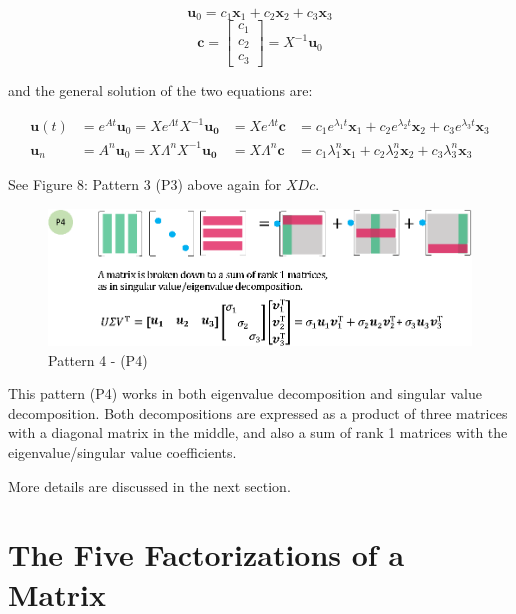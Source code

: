 \documentclass[letterpaper]{article}
\begin{document}
\begin{equation*}
  \bm{u}_0 = c_1 \bm{x}_1 + c_2 \bm{x}_2 + c_3 \bm{x}_3
\end{equation*}
\begin{equation*}
  \bm{c} =
  \begin{bmatrix}
    c_1\\
    c_2\\
    c_3
  \end{bmatrix} = X^{-1} \bm{u}_0
\end{equation*}

and the general solution of the two equations are:

\begin{align*}
  \bm{u}(t) &= e^{At} \bm{u}_0 = X e^{\Lambda t} X^{-1} \bm{u_0} &= X e^{\Lambda t} \bm{c} &= c_1 e^{\lambda_1 t} \bm{x}_1 + c_2 e^{\lambda_2 t} \bm{x}_2 + c_3 e^{\lambda_3 t} \bm{x}_3\\
  \bm{u}_n &= A^n \bm{u}_0 = X \Lambda^n X^{-1} \bm{u_0} &= X \Lambda^n \bm{c} &= c_1 \lambda_1^n \bm{x}_1 + c_2 \lambda_2^n \bm{x}_2 + c_3 \lambda_3^n \bm{x}_3
\end{align*}

See Figure 8: Pattern 3 (P3) above again for $XDc$.

\begin{figure}[H]
  \centering
  \includegraphics[scale=0.8]{Pattern4.eps}
  \caption{Pattern 4 - (P4)}
\end{figure}

This pattern (P4) works in both eigenvalue decomposition and singular value decomposition.
Both decompositions are expressed as a product of three matrices with a diagonal matrix in the middle,
and also a sum of rank 1 matrices with the eigenvalue/singular value coefficients.

More details are discussed in the next section.

\clearpage

\section{The Five Factorizations of a Matrix}
\end{document}
